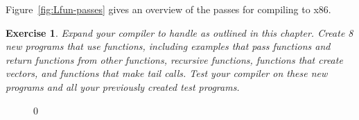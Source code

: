 \documentclass[7x10]{TimesAPriori_MIT}%
\def\racketEd{0}
\def\edition{0}
\newtheorem{exercise}[theorem]{Exercise}
\numberwithin{theorem}{chapter}
\numberwithin{definition}{chapter}
\numberwithin{equation}{chapter}
\begin{document}
Figure~\ref{fig:Lfun-passes} gives an overview of the passes for
compiling \LangFun{} to x86.

\begin{exercise}\normalfont\normalsize
Expand your compiler to handle \LangFun{} as outlined in this chapter.
Create 8 new programs that use functions, including examples that pass
functions and return functions from other functions, recursive
functions, functions that create vectors, and functions that make tail
calls. Test your compiler on these new programs and all your
previously created test programs.
\end{exercise}


\begin{figure}[tbp]
  \begin{tcolorbox}[colback=white]
{\if\edition\racketEd    
    }
\end{tcolorbox}
\end{figure}
\end{document}
